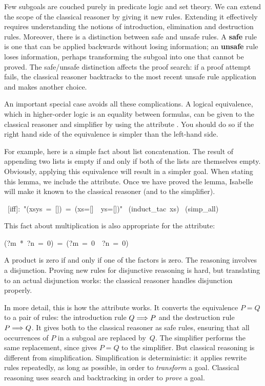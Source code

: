 Few subgoals are couched purely in predicate logic and set theory.
We can extend the scope of the classical reasoner by giving it new rules. 
Extending it effectively requires understanding the notions of
introduction, elimination and destruction rules.  Moreover, there is a
distinction between  safe and unsafe rules. A 
\textbf{safe} rule is one that can be applied 
backwards without losing information; an
\textbf{unsafe} rule loses  information, perhaps
transforming the subgoal into one that cannot be proved.  The safe/unsafe
distinction affects the proof search: if a proof attempt fails, the
classical reasoner backtracks to the most recent unsafe rule application
and makes another choice. 

An important special case avoids all these complications.  A logical 
equivalence, which in higher-order logic is an equality between 
formulas, can be given to the classical 
reasoner and simplifier by using the attribute .  You 
should do so if the right hand side of the equivalence is  
simpler than the left-hand side.  

For example, here is a simple fact about list concatenation. 
The result of appending two lists is empty if and only if both 
of the lists are themselves empty. Obviously, applying this equivalence 
will result in a simpler goal. When stating this lemma, we include 
the  attribute. Once we have proved the lemma, Isabelle 
will make it known to the classical reasoner (and to the simplifier). 
\begin{isabelle}
\
[iff]:\ "(xs{\isacharat}ys\ =\ [])\ =\
(xs=[]\ \isasymand\ ys=[])"\isanewline
{}\ (induct_tac\ xs)\isanewline
\isacommand{apply}\ (simp_all)\isanewline
\isacommand{done}
\end{isabelle}
%
This fact about multiplication is also appropriate for 
the  attribute:
\begin{isabelle}
(\mbox{?m}\ *\ \mbox{?n}\ =\ 0)\ =\ (\mbox{?m}\ =\ 0\ \isasymor\ \mbox{?n}\ =\ 0)
\end{isabelle}
A product is zero if and only if one of the factors is zero.  The
reasoning  involves a disjunction.  Proving new rules for
disjunctive reasoning  is hard, but translating to an actual disjunction
works:  the classical reasoner handles disjunction properly.

In more detail, this is how the  attribute works.  It converts
the equivalence $P=Q$ to a pair of rules: the introduction
rule $Q\Longrightarrow P$ and the destruction rule $P\Longrightarrow Q$.  It gives both to the
classical reasoner as safe rules, ensuring that all occurrences of $P$ in
a subgoal are replaced by~$Q$.  The simplifier performs the same
replacement, since \isa{iff} gives $P=Q$ to the
simplifier.  But classical reasoning is different from
simplification.  Simplification is deterministic: it applies rewrite rules
repeatedly, as long as possible, in order to \emph{transform} a goal.  Classical
reasoning uses search and backtracking in order to \emph{prove} a goal.%
\index{*blast (method)|)}%



